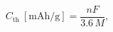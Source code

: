 \documentclass[preview]{standalone}
\begin{document}
\[C_\text{th}~[\text{mAh/g}] = \frac{nF}{3.6\,M},\]
\end{document}
